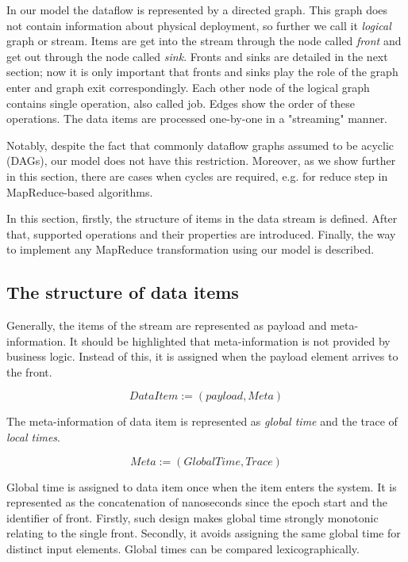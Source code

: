 
\label {fs-model-section}


In our model the dataflow is represented by a directed graph. This graph does not contain information about physical deployment, so further we call it {\it logical} graph or stream. Items are get into the stream through the node called {\it front} and get out through the node called {\it sink}. Fronts and sinks are detailed in the next section; now it is only important that fronts and sinks play the role of the graph enter and graph exit correspondingly. Each other node of the logical graph contains single operation, also called job. Edges show the order of these operations. The data items are processed one-by-one in a "streaming" manner. 

Notably, despite the fact that commonly dataflow graphs assumed to be acyclic (DAGs), our model does not have this restriction. Moreover, as we show further in this section, there are cases when cycles are required, e.g. for reduce step in MapReduce-based algorithms. 

In this section, firstly, the structure of items in the data stream is defined. After that, supported operations and their properties are introduced. Finally, the way to implement any MapReduce transformation using our model is described.

\subsection{The structure of data items}
Generally, the items of the stream are represented as payload and meta-information. It should be highlighted that meta-information is not provided by business logic. Instead of this, it is assigned when the payload element arrives to the front. 

\[DataItem := (payload, Meta)\]

The meta-information of data item is represented as {\it global time} and the trace of {\it local times}.

\[Meta := (GlobalTime, Trace)\]

Global time is assigned to data item once when the item enters the system. It is represented as the concatenation of nanoseconds since the epoch start and the identifier of front. Firstly, such design makes global time strongly monotonic relating to the single front. Secondly, it avoids assigning the same global time for distinct input elements. Global times can be compared lexicographically.


